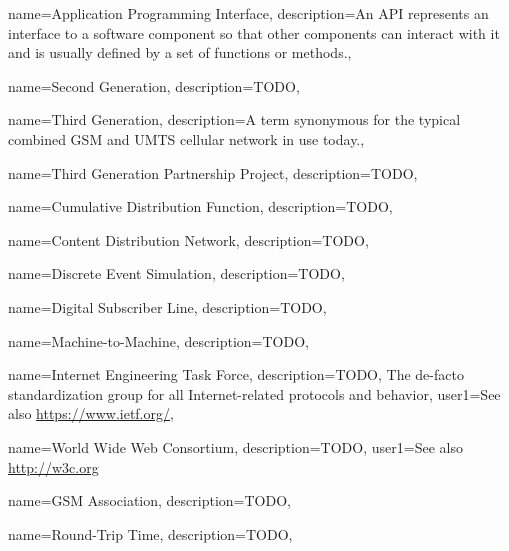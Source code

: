 

{
  name=Application Programming Interface,
  description={An API represents an interface to a software component so that other components can interact with it and is usually defined by a set of functions or methods.},
}

{
  name=Second Generation,
  description={TODO},
}

{
  name=Third Generation,
  description={A term synonymous for the typical combined \acrshort{GSM} and \acrshort{UMTS} cellular network in use today.},
}

{
  name=Third Generation Partnership Project,
  description={TODO},
}

{
  name=Cumulative Distribution Function,
  description={TODO},
}

{
  name=Content Distribution Network,
  description={TODO},
}

{
  name=Discrete Event Simulation,
  description={TODO},
}

{
  name=Digital Subscriber Line,
  description={TODO},
}

{
  name=Machine-to-Machine,
  description={TODO},
}

{
  name=Internet Engineering Task Force,
  description={TODO, The de-facto standardization group for all Internet-related protocols and behavior},
  user1={See also \url{https://www.ietf.org/}},
}


{
  name=World Wide Web Consortium,
  description={TODO},
  user1={See also \url{http://w3c.org}}
}

{
  name=\acrshort{GSM} Association,
  description={TODO},
}

{
  name=Round-Trip Time,
  description={TODO},
}

